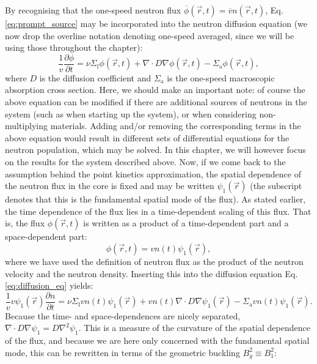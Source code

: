 By recognising that the one-speed neutron flux $\overline{\phi}(\vec{r}, t) = \overline{v}n(\vec{r}, t)$, Eq. \ref{eq:prompt_source} may be incorporated into the neutron diffusion equation (we now drop the overline notation denoting one-speed averaged, since we will be using those throughout the chapter):
\begin{equation}
	\frac{1}{v}\frac{\partial \phi}{\partial t} = \nu \Sigma_\text{f}\phi(\vec{r}, t) + \nabla \cdot D\nabla \phi(\vec{r}, t) - \Sigma_\text{a}\phi(\vec{r}, t),
	\label{eq:diffusion_eq}
\end{equation}
where $D$ is the diffusion coefficient and $\Sigma_\text{a}$ is the one-speed macroscopic absorption cross section. Here, we should make an important note: of course the above equation can be modified if there are additional sources of neutrons in the system (such as when starting up the system), or when considering non-multiplying materials. Adding and/or removing the corresponding terms in the above equation would result in different sets of differential equations for the neutron population, which may be solved. In this chapter, we will however focus on the results for the system described above. Now, if we come back to the assumption behind the point kinetics approximation, the spatial dependence of the neutron flux in the core is fixed and may be written $\psi_1(\vec{r})$ (the subscript denotes that this is the fundamental spatial mode of the flux). As stated earlier, the time dependence of the flux lies in a time-dependent scaling of this flux. That is, the flux $\phi(\vec{r}, t)$ is written as a product of a time-dependent part and a space-dependent part:
\begin{equation}
	\phi(\vec{r}, t) = v n(t) \psi_1(\vec{r}),
	\label{eq:neutron_flux_time_space}
\end{equation}
where we have used the definition of neutron flux as the product of the neutron velocity and the neutron density. Inserting this into the diffusion equation Eq. \ref{eq:diffusion_eq} yields:
\begin{equation}
	\frac{1}{v} v \psi_1(\vec{r})\frac{\partial n}{\partial t} = \nu \Sigma_\text{f}v n(t) \psi_1(\vec{r}) + v n(t) \nabla \cdot D\nabla \psi_1(\vec{r}) - \Sigma_\text{a}v n(t) \psi_1(\vec{r}).
	\label{eq:diffusion_eq_expanded1}
\end{equation}
Because the time- and space-dependences are nicely separated, $\nabla \cdot D\nabla \psi_1 = D\nabla^2 \psi_1$. This is a measure of the curvature of the spatial dependence of the flux, and because we are here only concerned with the fundamental spatial mode, this can be rewritten in terms of the geometric buckling $B_g^2 \equiv B_1^2$:
